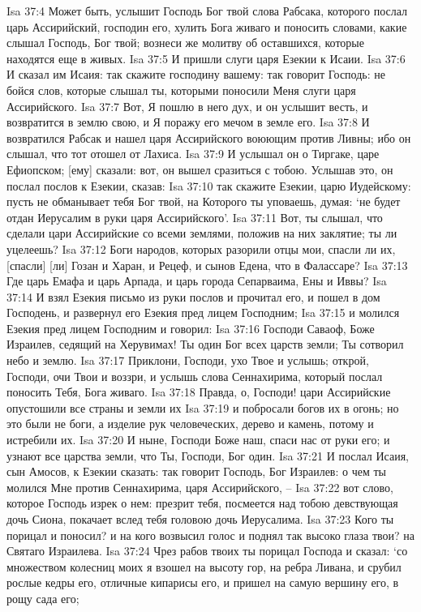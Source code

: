 Isa 37:4  Может быть, услышит Господь Бог твой слова Рабсака, которого послал царь Ассирийский, господин его, хулить Бога живаго и поносить словами, какие слышал Господь, Бог твой; вознеси же молитву об оставшихся, которые находятся еще в живых.
Isa 37:5  И пришли слуги царя Езекии к Исаии.
Isa 37:6  И сказал им Исаия: так скажите господину вашему: так говорит Господь: не бойся слов, которые слышал ты, которыми поносили Меня слуги царя Ассирийского.
Isa 37:7  Вот, Я пошлю в него дух, и он услышит весть, и возвратится в землю свою, и Я поражу его мечом в земле его.
Isa 37:8  И возвратился Рабсак и нашел царя Ассирийского воюющим против Ливны; ибо он слышал, что тот отошел от Лахиса.
Isa 37:9  И услышал он о Тиргаке, царе Ефиопском; [ему] сказали: вот, он вышел сразиться с тобою. Услышав это, он послал послов к Езекии, сказав:
Isa 37:10  так скажите Езекии, царю Иудейскому: пусть не обманывает тебя Бог твой, на Которого ты уповаешь, думая: `не будет отдан Иерусалим в руки царя Ассирийского'.
Isa 37:11  Вот, ты слышал, что сделали цари Ассирийские со всеми землями, положив на них заклятие; ты ли уцелеешь?
Isa 37:12  Боги народов, которых разорили отцы мои, спасли ли их, [спасли] [ли] Гозан и Харан, и Рецеф, и сынов Едена, что в Фалассаре?
Isa 37:13  Где царь Емафа и царь Арпада, и царь города Сепарваима, Ены и Иввы?
Isa 37:14  И взял Езекия письмо из руки послов и прочитал его, и пошел в дом Господень, и развернул его Езекия пред лицем Господним;
Isa 37:15  и молился Езекия пред лицем Господним и говорил:
Isa 37:16  Господи Саваоф, Боже Израилев, седящий на Херувимах! Ты один Бог всех царств земли; Ты сотворил небо и землю.
Isa 37:17  Приклони, Господи, ухо Твое и услышь; открой, Господи, очи Твои и воззри, и услышь слова Сеннахирима, который послал поносить Тебя, Бога живаго.
Isa 37:18  Правда, о, Господи! цари Ассирийские опустошили все страны и земли их
Isa 37:19  и побросали богов их в огонь; но это были не боги, а изделие рук человеческих, дерево и камень, потому и истребили их.
Isa 37:20  И ныне, Господи Боже наш, спаси нас от руки его; и узнают все царства земли, что Ты, Господи, Бог один.
Isa 37:21  И послал Исаия, сын Амосов, к Езекии сказать: так говорит Господь, Бог Израилев: о чем ты молился Мне против Сеннахирима, царя Ассирийского, --
Isa 37:22  вот слово, которое Господь изрек о нем: презрит тебя, посмеется над тобою девствующая дочь Сиона, покачает вслед тебя головою дочь Иерусалима.
Isa 37:23  Кого ты порицал и поносил? и на кого возвысил голос и поднял так высоко глаза твои? на Святаго Израилева.
Isa 37:24  Чрез рабов твоих ты порицал Господа и сказал: `со множеством колесниц моих я взошел на высоту гор, на ребра Ливана, и срубил рослые кедры его, отличные кипарисы его, и пришел на самую вершину его, в рощу сада его;
